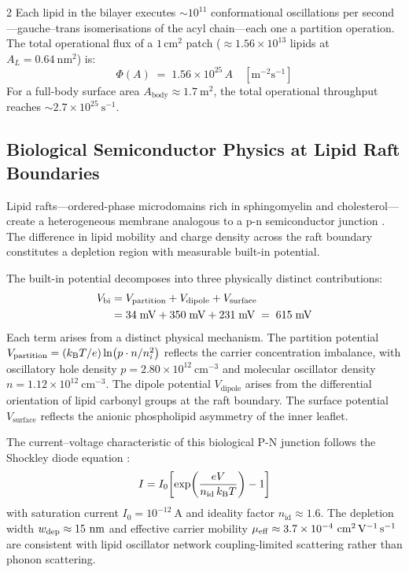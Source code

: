 \begin{multicols}{2}
Each lipid in the bilayer executes $\sim 10^{11}$ conformational oscillations per second---gauche--trans isomerisations of the acyl chain---each one a partition operation. The total operational flux of a $1\,\mathrm{cm}^2$ patch ($\approx 1.56 \times 10^{13}$ lipids at $A_L = 0.64\ \mathrm{nm}^2$) is:
\begin{equation}
\Phi(A) \;=\; 1.56 \times 10^{25}\, A \quad [\mathrm{m}^{-2}\mathrm{s}^{-1}]
\label{eq:ch11_flux}
\end{equation}
For a full-body surface area $A_{\mathrm{body}} \approx 1.7\ \mathrm{m}^2$, the total operational throughput reaches $\sim 2.7 \times 10^{25}\ \mathrm{s}^{-1}$.

\subsection{Biological Semiconductor Physics at Lipid Raft Boundaries}

Lipid rafts---ordered-phase microdomains rich in sphingomyelin and cholesterol---create a heterogeneous membrane analogous to a p-n semiconductor junction \citep{simons1997}. The difference in lipid mobility and charge density across the raft boundary constitutes a depletion region with measurable built-in potential.

The built-in potential decomposes into three physically distinct contributions:
\begin{align}
V_{\mathrm{bi}} &= V_{\mathrm{partition}} + V_{\mathrm{dipole}} + V_{\mathrm{surface}} \notag\\
     &= 34\;\mathrm{mV} + 350\;\mathrm{mV} + 231\;\mathrm{mV} \;=\; 615\;\mathrm{mV}
\label{eq:ch11_vbi}
\end{align}
Each term arises from a distinct physical mechanism. The partition potential $V_{\mathrm{partition}} = (k_{\mathrm{B}} T / e)\ln(p \cdot n / n_i^2)$ reflects the carrier concentration imbalance, with oscillatory hole density $p = 2.80 \times 10^{12}\ \mathrm{cm}^{-3}$ and molecular oscillator density $n = 1.12 \times 10^{12}\ \mathrm{cm}^{-3}$. The dipole potential $V_{\mathrm{dipole}}$ arises from the differential orientation of lipid carbonyl groups at the raft boundary. The surface potential $V_{\mathrm{surface}}$ reflects the anionic phospholipid asymmetry of the inner leaflet.

The current--voltage characteristic of this biological P-N junction follows the Shockley diode equation \citep{shockley1949}:
\begin{equation}
I = I_0\!\left[\exp\!\left(\frac{eV}{n_{\mathrm{id}}\,k_{\mathrm{B}} T}\right) - 1\right]
\label{eq:ch11_shockley}
\end{equation}
with saturation current $I_0 = 10^{-12}\ \mathrm{A}$ and ideality factor $n_{\mathrm{id}} \approx 1.6$. The depletion width $\wdep \approx 15\ \mathrm{nm}$ and effective carrier mobility $\mueff \approx 3.7 \times 10^{-4}\ \mathrm{cm}^2\,\mathrm{V}^{-1}\,\mathrm{s}^{-1}$ are consistent with lipid oscillator network coupling-limited scattering rather than phonon scattering.


\end{multicols}
